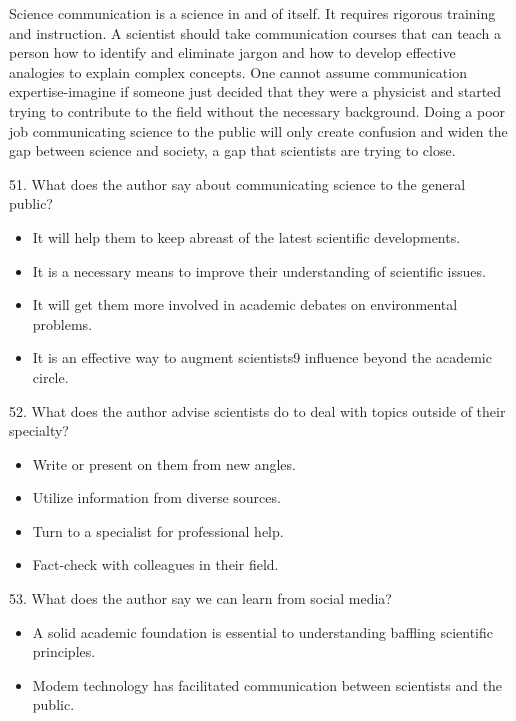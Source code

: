 \documentclass[UTF8,11pt]{ctexart}
\begin{document}
Science communication is a science in and of itself. It requires rigorous training and instruction. A scientist should take communication courses that can teach a person how to identify and eliminate jargon and how to develop effective analogies to explain complex concepts. One cannot assume communication expertise-imagine if someone just decided that they were a physicist and started trying to contribute to the field without the necessary background. Doing a poor job communicating science to the public will only create confusion and widen the gap between science and society, a gap that scientists are trying to close.


51. What does the author say about communicating science to the general public?


\begin{itemize}[leftmargin=2em,itemsep=.2em,topsep=.4em]\item[A.] It will help them to keep abreast of the latest scientific developments.
\item[B.] It is a necessary means to improve their understanding of scientific issues.
\item[C.] It will get them more involved in academic debates on environmental problems.
\item[D.] It is an effective way to augment scientists9 influence beyond the academic circle.
\end{itemize}

52. What does the author advise scientists do to deal with topics outside of their specialty?


\begin{itemize}[leftmargin=2em,itemsep=.2em,topsep=.4em]\item[A.] Write or present on them from new angles.
\item[B.] Utilize information from diverse sources.
\item[C.] Turn to a specialist for professional help.
\item[D.] Fact-check with colleagues in their field.
\end{itemize}

53. What does the author say we can learn from social media?


\begin{itemize}[leftmargin=2em,itemsep=.2em,topsep=.4em]\item[A.] A solid academic foundation is essential to understanding baffling scientific principles.
\item[B.] Modem technology has facilitated communication between scientists and the public.
\end{itemize}
\end{document}
